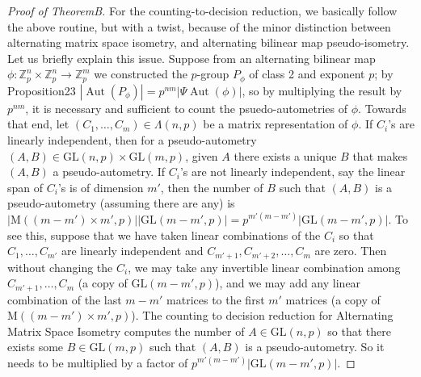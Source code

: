 \documentclass[10pt,a4paper]{article}
\begin{document}
\begin{proof}[Proof of TheoremB]
For the counting-to-decision reduction, we basically follow the above routine, but with a twist, because of the minor distinction between alternating matrix space isometry, and alternating bilinear map pseudo-isometry. Let us briefly explain this issue. Suppose from an alternating bilinear map $\phi:\mathbb Z_p^n\times\mathbb Z_p^n\to\mathbb Z_p^m$ we constructed the $p$-group $P_\phi$ of class 2 and exponent $p$; by Proposition23 $|\operatorname{Aut}(P_\phi)|=p^{nm}|\Psi\operatorname{Aut}(\phi)|$, so by multiplying the result by $p^{nm}$, it is necessary and sufficient to count the psuedo-autometries of $\phi$.
Towards that end, let $(C_1,\ldots,C_m)\in\Lambda(n,p)$ be a matrix representation of $\phi$. If $C_i$'s are linearly independent, then for a pseudo-autometry $(A,B)\in\mathrm{GL}(n,p)\times\mathrm{GL}(m,p)$, given $A$ there exists a unique $B$ that makes $(A,B)$ a pseudo-autometry. If $C_i$'s are not linearly independent, say the linear span of $C_i$'s is of dimension $m'$, then the number of $B$ such that $(A,B)$ is a pseudo-autometry (assuming there are any) is $|\mathrm M((m-m')\times m',p)||\mathrm{GL}(m-m',p)|=p^{m'(m-m')}|\mathrm{GL}(m-m',p)|$. To see this, suppose that we have taken linear combinations of the $C_i$ so that $C_1,\ldots,C_{m'}$ are linearly independent and $C_{m'+1},C_{m'+2},\ldots,C_m$ are zero. Then without changing the $C_i$, we may take any invertible linear combination among $C_{m'+1},\ldots,C_m$ (a copy of $\mathrm{GL}(m-m',p)$), and we may add any linear combination of the last $m-m'$ matrices to the first $m'$ matrices (a copy of $\mathrm M((m-m')\times m',p)$). The counting to decision reduction for Alternating Matrix Space Isometry computes the number of $A\in\mathrm{GL}(n,p)$ so that there exists some $B\in\mathrm{GL}(m,p)$ such that $(A,B)$ is a pseudo-autometry. So it needs to be multiplied by a factor of $p^{m'(m-m')}|\mathrm{GL}(m-m',p)|$.
\end{proof}
\end{document}

